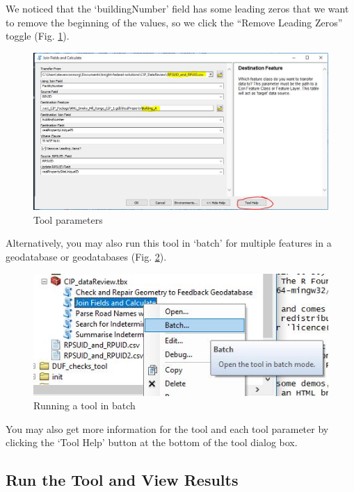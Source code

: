 \documentclass[openany]{book}
\theoremstyle{definition}
\theoremstyle{definition}
\theoremstyle{definition}
\theoremstyle{remark}
\begin{document}
We noticed that the `buildingNumber' field has some leading zeros that
we want to remove the beginning of the values, so we click the ``Remove
Leading Zeros'' toggle (Fig. \ref{fig:jcparams}).

\begin{figure}[H]

{\centering \includegraphics{figures/joinCalc-toolparams} 

}

\caption{Tool parameters}\label{fig:jcparams}
\end{figure}

Alternatively, you may also run this tool in `batch' for multiple
features in a geodatabase or geodatabases (Fig. \ref{fig:batch}).

\begin{figure}[H]

{\centering \includegraphics{figures/joinCalc-batch} 

}

\caption{Running a tool in batch}\label{fig:batch}
\end{figure}

You may also get more information for the tool and each tool parameter
by clicking the `Tool Help' button at the bottom of the tool dialog box.

\subsection{Run the Tool and View
Results}\label{run-the-tool-and-view-results}
\end{document}
